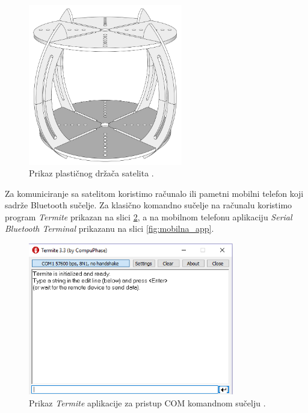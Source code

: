 \documentclass[times, utf8, diplomski, numeric]{templates/template}
\begin{document}
{{        \begin{figure}[htb]
        \centering
        \includegraphics[width=0.6\textwidth]{images/drzac.png}
        \caption{Prikaz plastičnog držača satelita \cite{zracni_lezaj}.}
        \label{fig:drzac}
        \end{figure}

        Za komuniciranje sa satelitom koristimo računalo ili pametni mobilni telefon koji sadrže Bluetooth sučelje. Za klasično komandno sučelje na računalu koristimo program \emph{Termite} \cite{termite} prikazan na slici \ref{fig:termite}, a na mobilnom telefonu aplikaciju \emph{Serial Bluetooth Terminal} \cite{mobilna_app} prikazanu na slici \ref{fig:mobilna_app}.

        \begin{figure}[htb]
        \centering
        \includegraphics[width=0.8\textwidth]{images/termite.png}
        \caption{Prikaz \emph{Termite} aplikacije za pristup COM komandnom sučelju \cite{termite}.}
        \label{fig:termite}
        \end{figure}

}}
\end{document}
